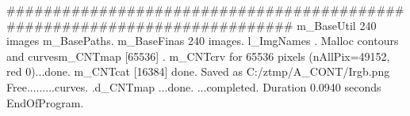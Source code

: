 ##########################################################################
m_BaseUtil 240 images
m_BasePaths.
m_BaseFinas 240 images.
l_ImgNames .
Malloc contours and curvesm_CNTmap 	[65536] .
m_CNTcrv for   65536 pixels (nAllPix=49152, red 0)...done.
m_CNTcat [16384]
done.
Saved as C:/ztmp/A_CONT/Irgb.png
Free.........curves.
.d_CNTmap ...done.
...completed.
Duration 0.0940 seconds
EndOfProgram.
